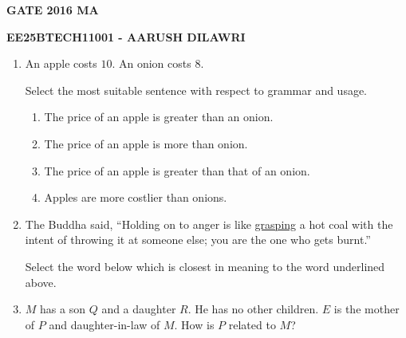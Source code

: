 \documentclass[journal]{IEEEtran}
\numberwithin{equation}{enumi}
\numberwithin{figure}{enumi}
\begin{document}


\begin{center}
    \LARGE \textbf{GATE 2016 MA}
    
    \large \textbf{EE25BTECH11001 - AARUSH DILAWRI}
\end{center}

\begin{enumerate}
\item An apple costs $10$. An onion costs $8$.

Select the most suitable sentence with respect to grammar and usage.

\begin{enumerate}

\item The price of an apple is greater than an onion.
\item The price of an apple is more than onion.
\item The price of an apple is greater than that of an onion.
\item Apples are more costlier than onions.

\end{enumerate}

\hfill{}

\item The Buddha said, ``Holding on to anger is like \underline{grasping} a hot coal with the intent of throwing it at someone else; you are the one who gets burnt.''

Select the word below which is closest in meaning to the word underlined above.

\begin{enumerate}
\end{enumerate}

\hfill{}

\item $M$ has a son $Q$ and a daughter $R$. He has no other children. $E$ is the mother of $P$ and daughter-in-law of $M$. How is $P$ related to $M$?

\begin{enumerate}
\end{enumerate}


\end{enumerate}
\end{document}
